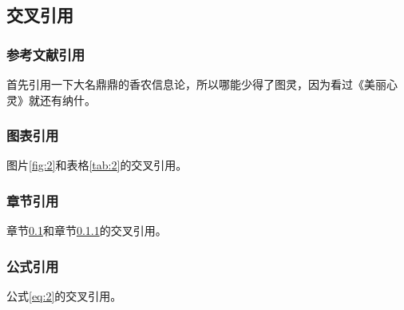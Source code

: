 \begin{ujnbody}
    \subsection{交叉引用}\label{sec:3}
    \subsubsection{参考文献引用}\label{sec:4}
    首先引用一下大名鼎鼎的香农信息论\cite{shannon1948mathematical}，所以哪能少得了图灵\cite{turing2009computing}，因为看过《美丽心灵》就还有纳什\cite{nash1996non}。
    \subsubsection{图表引用}
    图片\ref{fig:2}和表格\ref{tab:2}的交叉引用。
    \subsubsection{章节引用}
    章节\ref{sec:3}和章节\ref{sec:4}的交叉引用。
    \subsubsection{公式引用}
    公式\ref{eq:2}的交叉引用。
\end{ujnbody}